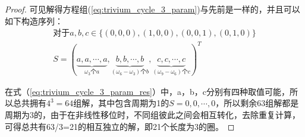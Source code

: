 \begin{thm}
\begin{proof}
可见解得方程组(\ref{eq:trivium_cycle_3_param})与先前是一样的，并且可以如下构造序列：
\begin{align}
\label{eq:trivium_cycle_3_param_res}
\text{对于}a, b, c \in \{(0, 0, 0), (1, 0, 0), (0, 0, 1), (0, 1, 0)\}\\
S = (\underbrace{a,a,\cdots,a}_{\omega_{3}\text{个}a},\underbrace{b,b,\cdots,b}_{(\omega_{6}-\omega_{3})\text{个}b},\underbrace{c,c,\cdots,c}_{(\omega_{9}-\omega_{6})\text{个}c})^{T}
\end{align}

在式（\ref{eq:trivium_cycle_3_param_res}）中，a，b，c分别有四种取值可能，所以总共拥有$4^{3}=64$组解，其中包含周期为1的$S={0,0,\cdots,0}$，所以剩余63组解都是周期为3的，由于在非线性移位时，不同组彼此之间会相互转化，去除重复计算，可得总共有63/3=21的相互独立的解，即21个长度为3的圈。

\end{proof}
\end{thm}

